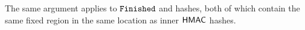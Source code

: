 The same argument applies to $\mathtt{Finished}$ and  hashes, both of which contain the same fixed region in the same location as inner $\mathsf{HMAC}$ hashes.
%
%	
%
%	 
%
%	 
%	

